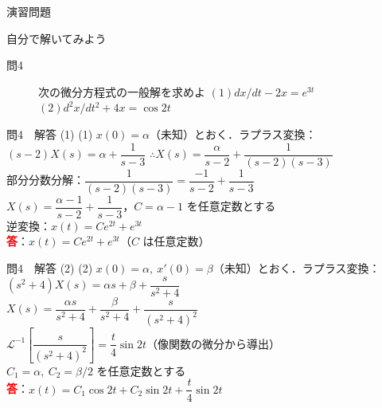 \documentclass[professionalfonts]{beamer}
\begin{document}
\begin{frame}{演習問題}
  \begin{exampleblock}{自分で解いてみよう}
  \begin{description}
    \item[問4] 次の微分方程式の一般解を求めよ
    $(1) dx/dt - 2x = e^{3t}$\\
    $(2) d^{2}x/dt^{2} + 4x = \cos 2t$\\
  \end{description}
  \end{exampleblock}
\end{frame}

\begin{frame}{問4　解答 (1)}
  (1) $x(0) = \alpha$（未知）とおく．ラプラス変換：\\[4pt]
  $(s-2)X(s) = \alpha + \dfrac{1}{s-3}$ \quad $\therefore X(s) = \dfrac{\alpha}{s-2} + \dfrac{1}{(s-2)(s-3)}$\\[4pt]
  部分分数分解：$\dfrac{1}{(s-2)(s-3)} = \dfrac{-1}{s-2} + \dfrac{1}{s-3}$\\[4pt]
  $X(s) = \dfrac{\alpha-1}{s-2} + \dfrac{1}{s-3}$，\quad $C = \alpha-1$ を任意定数とする\\[4pt]
  逆変換：$x(t) = Ce^{2t} + e^{3t}$
  \\[8pt]\textcolor{red}{\textbf{答}}：$x(t) = Ce^{2t} + e^{3t}$（$C$ は任意定数）
\end{frame}

\begin{frame}{問4　解答 (2)}
  (2) $x(0)=\alpha,\ x'(0)=\beta$（未知）とおく．ラプラス変換：\\[4pt]
  $(s^{2}+4)X(s) = \alpha s + \beta + \dfrac{s}{s^{2}+4}$\\[4pt]
  $X(s) = \dfrac{\alpha s}{s^{2}+4} + \dfrac{\beta}{s^{2}+4} + \dfrac{s}{(s^{2}+4)^{2}}$\\[4pt]
  $\mathcal{L}^{-1}\!\left[\dfrac{s}{(s^{2}+4)^{2}}\right] = \dfrac{t}{4}\sin 2t$（像関数の微分から導出）\\[4pt]
  $C_{1} = \alpha,\ C_{2} = \beta/2$ を任意定数とする
  \\[8pt]\textcolor{red}{\textbf{答}}：$x(t) = C_{1}\cos 2t + C_{2}\sin 2t + \dfrac{t}{4}\sin 2t$
\end{frame}
\end{document}
